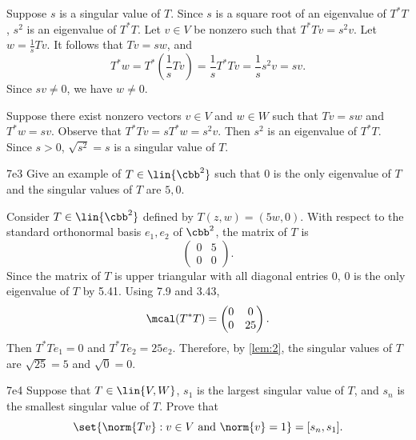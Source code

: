 \begin{soliff}
    \rightimp Suppose $s$ is a singular value of $T$.
    Since $s$ is a square root of an eigenvalue of $T^\ast T$, $s^2$ is an eigenvalue of $T^\ast T$.
    Let $v \in V$ be nonzero such that $T^\ast T v = s^2 v$. 
    Let $w = \frac{1}{s} Tv$. 
    It follows that $Tv = sw$, and  
    \[
        T^\ast w = T^\ast \left(\frac{1}{s} Tv\right) = \frac{1}{s} T^\ast T v = \frac{1}{s} s^2 v = sv.
    \]
    Since $sv \neq 0$, we have $w \neq 0$.

    \leftimp Suppose there exist nonzero vectors $v \in V$ and $w \in W$ such that $Tv = sw$ and $T^\ast w = sv$.
    Observe that $T^\ast Tv = s T^\ast w = s^2 v$.
    Then $s^2$ is an eigenvalue of $T^\ast T$.
    Since $s > 0$, $\sqrt{s^2} = s$ is a singular value of $T$.
\end{soliff}

\begin{exercise}{7e3}
    Give an example of $T \in \lin{\cbb^2}$ such that $0$ is the only eigenvalue of $T$ and the singular values of $T$ are $5, 0$.
\end{exercise}

\begin{sol}
    Consider $T \in \lin{\cbb^2}$ defined by $T(z, w) = (5w, 0)$.
    With respect to the standard orthonormal basis $e_1, e_2$ of $\cbb^2$, the matrix of $T$ is 
    \[
        \begin{pmatrix}
            0 & 5 \\
            0 & 0
        \end{pmatrix}.
    \]
    Since the matrix of $T$ is upper triangular with all diagonal entries $0$, $0$ is the only eigenvalue of $T$ by 5.41.
    Using 7.9 and 3.43,
    \[
        \mcal(T^\ast T) = 
        \begin{pmatrix}
            0 & 0 \\
            0 & 25
        \end{pmatrix}.
    \]
    Then $T^\ast T e_1 = 0$ and $T^\ast T e_2 = 25 e_2$.
    Therefore, by \autoref{lem:2}, the singular values of $T$ are $\sqrt{25} = 5$ and $\sqrt{0} = 0$.
\end{sol}

\begin{exercise}{7e4}
    Suppose that $T \in \lin{V, W}$, $s_1$ is the largest singular value of $T$, and $s_n$ is the smallest singular value of $T$.
    Prove that
    \[
        \set{\norm{Tv} : v \in V \text{ and } \norm{v} = 1} = [s_n, s_1].
    \]
\end{exercise}

